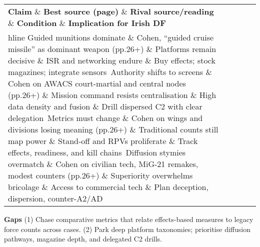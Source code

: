  
\begin{tabular}{p{3.2cm}p{4.2cm}p{3.6cm}p{3.2cm}p{4.2cm}}
	\textbf{Claim} \& \textbf{Best source (page)} \& \textbf{Rival source/reading} \& \textbf{Condition} \& \textbf{Implication for Irish DF}\\hline
	Guided munitions dominate \& Cohen, “guided cruise missile” as dominant weapon (pp.26+) \& Platforms remain decisive \& ISR and networking endure \& Buy effects; stock magazines; integrate sensors\
	Authority shifts to screens \& Cohen on AWACS court-martial and central nodes (pp.26+) \& Mission command resists centralisation \& High data density and fusion \& Drill dispersed C2 with clear delegation\
	Metrics must change \& Cohen on wings and divisions losing meaning (pp.26+) \& Traditional counts still map power \& Stand-off and RPVs proliferate \& Track effects, readiness, and kill chains\
	Diffusion stymies overmatch \& Cohen on civilian tech, MiG-21 remakes, modest counters (pp.26+) \& Superiority overwhelms bricolage \& Access to commercial tech \& Plan deception, dispersion, counter-A2/AD\
\end{tabular}

\textbf{Gaps}
(1) Chase comparative metrics that relate effects-based measures to legacy force counts across cases.
(2) Park deep platform taxonomies; prioritise diffusion pathways, magazine depth, and delegated C2 drills.

